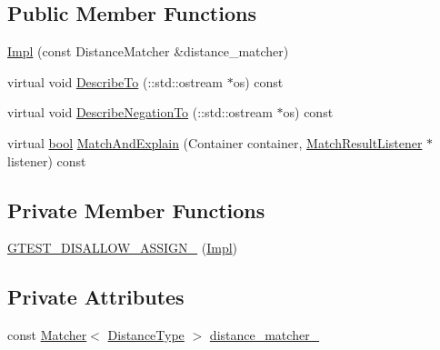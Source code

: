 \subsection*{Public Member Functions}
\begin{DoxyCompactItemize}
\item 
\hyperlink{classtesting_1_1internal_1_1BeginEndDistanceIsMatcher_1_1Impl_a92f5afc23d317260d4a5bd091d2904a4}{Impl} (const Distance\+Matcher \&distance\+\_\+matcher)
\item 
virtual void \hyperlink{classtesting_1_1internal_1_1BeginEndDistanceIsMatcher_1_1Impl_a5ca27760e15a4f151cd0b964d724c6cf}{Describe\+To} (\+::std\+::ostream $\ast$os) const
\item 
virtual void \hyperlink{classtesting_1_1internal_1_1BeginEndDistanceIsMatcher_1_1Impl_a359711f21b6f116a5233fca78736fa47}{Describe\+Negation\+To} (\+::std\+::ostream $\ast$os) const
\item 
virtual \hyperlink{classbool}{bool} \hyperlink{classtesting_1_1internal_1_1BeginEndDistanceIsMatcher_1_1Impl_aa7bda59eae256018247699b0baa285c9}{Match\+And\+Explain} (Container container, \hyperlink{classtesting_1_1MatchResultListener}{Match\+Result\+Listener} $\ast$listener) const
\end{DoxyCompactItemize}
\subsection*{Private Member Functions}
\begin{DoxyCompactItemize}
\item 
\hyperlink{classtesting_1_1internal_1_1BeginEndDistanceIsMatcher_1_1Impl_a39ce69387cb535e4e9932a4f0452538d}{G\+T\+E\+S\+T\+\_\+\+D\+I\+S\+A\+L\+L\+O\+W\+\_\+\+A\+S\+S\+I\+G\+N\+\_\+} (\hyperlink{classtesting_1_1internal_1_1BeginEndDistanceIsMatcher_1_1Impl}{Impl})
\end{DoxyCompactItemize}
\subsection*{Private Attributes}
\begin{DoxyCompactItemize}
\item 
const \hyperlink{classtesting_1_1Matcher}{Matcher}$<$ \hyperlink{classtesting_1_1internal_1_1BeginEndDistanceIsMatcher_1_1Impl_a10d901c49e2793dae6bcce6fa1a4e9fe}{Distance\+Type} $>$ \hyperlink{classtesting_1_1internal_1_1BeginEndDistanceIsMatcher_1_1Impl_acc8d923e6901fa9c75bf76825b2baa6b}{distance\+\_\+matcher\+\_\+}
\end{DoxyCompactItemize}


